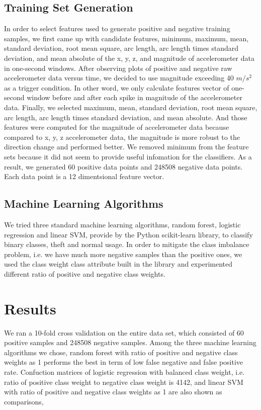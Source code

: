 \subsection{Training Set Generation}
In order to select features used to generate positive and negative training samples, we first came up with candidate features, minimum, maximum, mean, standard deviation, root mean square, arc length, arc length times standard deviation, and mean absolute of the x, y, z, and magnitude of accelerometer data in one-second windows. After observing plots of positive and negative raw accelerometer data versus time, we decided to use magnitude exceeding 40 $m/s^2$ as a trigger condition. In other word, we only calculate features vector of one-second window before and after each spike in magnitude of the accelerometer data. Finally, we selected maximum, mean, standard deviation, root mean square, arc length, arc length times standard deviation, and mean absolute. And those features were computed for the magnitude of accelerometer data because compared to x, y, z accelerometer data, the magnitude is more robust to the direction change and performed better. We removed minimum from the feature sets because it did not seem to provide useful infomation for the classifiers. As a result, we generated 60 positive data points and 248508 negative data points. Each data point is a 12 dimentsional feature vector.

\subsection{Machine Learning Algorithms}
We tried three standard machine learning algorithms, random forest, logistic regression and linear SVM, provide by the Python scikit-learn library, to classify binary classes, theft and normal usage. In order to mitigate the class imbalance problem, i.e. we have much more negative samples than the positive ones, we used the class weight class attribute built in the library and experimented different ratio of positive and negative class weights. 



\section{Results}
We ran a 10-fold cross validation on the entire data set, which consisted of 60 positive samples and 248508 negative samples. Among the three machine learning algorithms we chose, random forest with ratio of positive and negative class weights as 1 performs the best in term of low false negative and false positive rate. Confuction matrices of logistic regression with balanced class weight, i.e. ratio of positive class weight to negative class weight is 4142, and linear SVM with ratio of positive and negative class weights as 1 are also shown as comparisons, \\

